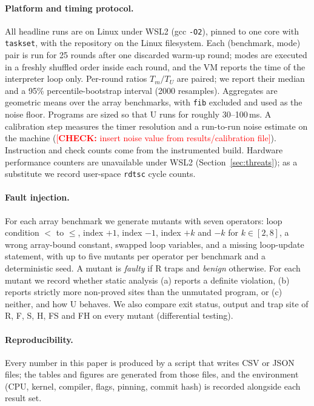 \documentclass[11pt,a4paper]{article}
\newcommand{\todo}[1]{\textcolor{red}{[\textbf{CHECK:} #1]}}
\begin{document}
\paragraph{Platform and timing protocol.} All headline runs are on Linux under WSL2 (gcc \texttt{-O2}), pinned to one core with \texttt{taskset}, with the repository on the Linux filesystem. Each (benchmark, mode) pair is run for 25 rounds after one discarded warm-up round; modes are executed in a freshly shuffled order inside each round, and the VM reports the time of the interpreter loop only. Per-round ratios $T_m/T_U$ are paired; we report their median and a 95\% percentile-bootstrap interval (2000 resamples). Aggregates are geometric means over the array benchmarks, with \texttt{fib} excluded and used as the noise floor. Programs are sized so that U runs for roughly 30--100\,ms. A calibration step measures the timer resolution and a run-to-run noise estimate on the machine (\todo{insert noise value from results/calibration file}). Instruction and check counts come from the instrumented build. Hardware performance counters are unavailable under WSL2 (Section~\ref{sec:threats}); as a substitute we record user-space \texttt{rdtsc} cycle counts.

\paragraph{Fault injection.} For each array benchmark we generate mutants with seven operators: loop condition $<$ to $\le$, index $+1$, index $-1$, index $+k$ and $-k$ for $k\in[2,8]$, a wrong array-bound constant, swapped loop variables, and a missing loop-update statement, with up to five mutants per operator per benchmark and a deterministic seed. A mutant is \emph{faulty} if R traps and \emph{benign} otherwise. For each mutant we record whether static analysis (a) reports a definite violation, (b) reports strictly more non-proved sites than the unmutated program, or (c) neither, and how U behaves. We also compare exit status, output and trap site of R, F, S, H, FS and FH on every mutant (differential testing).

\paragraph{Reproducibility.} Every number in this paper is produced by a script that writes CSV or JSON files; the tables and figures are generated from those files, and the environment (CPU, kernel, compiler, flags, pinning, commit hash) is recorded alongside each result set.
\end{document}
